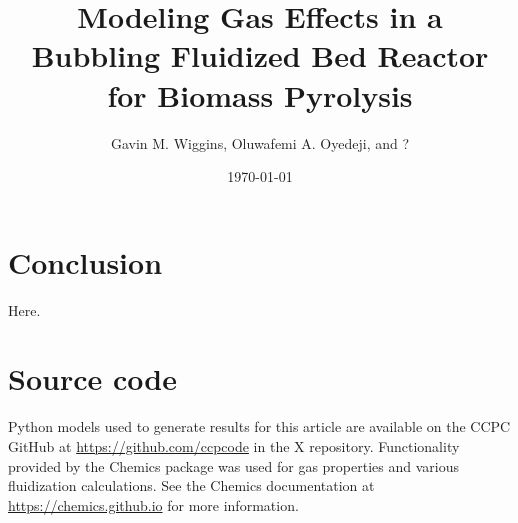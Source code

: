 \documentclass{article}
\title{Modeling Gas Effects in a Bubbling Fluidized Bed Reactor for Biomass Pyrolysis}
\author{Gavin M. Wiggins, Oluwafemi A. Oyedeji, and ?}
\date{\today}
\begin{document}
\maketitle
\tableofcontents








\section{Conclusion}

Here.

\section{Source code}

Python models used to generate results for this article are available on the CCPC GitHub at \url{https://github.com/ccpcode} in the X repository. Functionality provided by the Chemics package was used for gas properties and various fluidization calculations. See the Chemics documentation at \url{https://chemics.github.io} for more information.

\printbibliography
\end{document}
